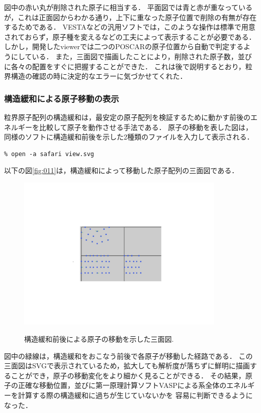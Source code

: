 図中の赤い丸が削除された原子に相当する．
平面図では青と赤が重なっているが，これは正面図からわかる通り，上下に重なった原子位置で削除の有無が存在するためである．
VESTAなどの汎用ソフトでは，このような操作は標準で用意されておらず，原子種を変えるなどの工夫によって表示することが必要である．
しかし，開発したviewerでは二つのPOSCARの原子位置から自動で判定するようにしている．
また，三面図で描画したことにより，削除された原子数，並びに各々の配置をすぐに把握することができた．
これは後で説明するとおり，粒界構造の確認の時に決定的なエラーに気づかせてくれた．

\subsubsection{構造緩和による原子移動の表示}
粒界原子配列の構造緩和は，最安定の原子配列を検証するために動かす前後のエネルギーを比較して原子を動作させる手法である．
原子の移動を表した図は，同様のソフトに構造緩和前後を示した2種類のファイルを入力して表示される．
\begin{lstlisting}[style=customCsh,basicstyle={\scriptsize\ttfamily}]
% ruby viewer.rb POSCAR_after POSCAR_before
% open -a safari view.svg 
\end{lstlisting}
以下の図\ref{fig:011}は，構造緩和によって移動した原子配列の三面図である．

\begin{figure}[htbp]\begin{center}
\includegraphics[width=10cm,bb= 0 0 937 753]{../figs/./boundary_narita.011.jpeg}
\caption{構造緩和前後による原子の移動を示した三面図.}
\label{fig:011}
\label{default}\end{center}\end{figure}

図中の緑線は，構造緩和をおこなう前後で各原子が移動した経路である．
この三面図はSVGで表示されているため，拡大しても解析度が落ちずに鮮明に描画することができ，原子の移動変化をより細かく見ることができる．
その結果，原子の正確な移動位置，並びに第一原理計算ソフトVASPによる系全体のエネルギーを計算する際の構造緩和に過ちが生じていないかを
容易に判断できるようになった．

